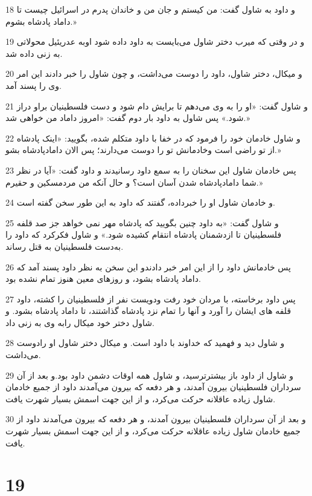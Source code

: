 \par 18 و داود به شاول گفت: من کیستم و جان من و خاندان پدرم در اسرائیل چیست تا داماد پادشاه بشوم.»
\par 19 و در وقتی که میرب دختر شاول می‌بایست به داود داده شود اوبه عدریئیل محولاتی به زنی داده شد.
\par 20 و میکال، دختر شاول، داود را دوست می‌داشت، و چون شاول را خبر دادند این امر وی را پسند آمد.
\par 21 و شاول گفت: «او را به وی می‌دهم تا برایش دام شود و دست فلسطینیان براو دراز شود.» پس شاول به داود بار دوم گفت: «امروز داماد من خواهی شد.»
\par 22 و شاول خادمان خود را فرمود که در خفا با داود متکلم شده، بگویید: «اینک پادشاه از تو راضی است وخادمانش تو را دوست می‌دارند؛ پس الان دامادپادشاه بشو.»
\par 23 پس خادمان شاول این سخنان را به سمع داود رسانیدند و داود گفت: «آیا در نظر شما دامادپادشاه شدن آسان است؟ و حال آنکه من مردمسکین و حقیرم.»
\par 24 و خادمان شاول او را خبرداده، گفتند که داود به این طور سخن گفته است.
\par 25 و شاول گفت: «به داود چنین بگویید که پادشاه مهر نمی خواهد جز صد قلفه فلسطینیان تا ازدشمنان پادشاه انتقام کشیده شود.» و شاول فکرکرد که داود را به‌دست فلسطینیان به قتل رساند.
\par 26 پس خادمانش داود را از این امر خبر دادندو این سخن به نظر داود پسند آمد که داماد پادشاه بشود، و روزهای معین هنوز تمام نشده بود.
\par 27 پس داود برخاسته، با مردان خود رفت ودویست نفر از فلسطینیان را کشته، داود قلفه های ایشان را آورد و آنها را تمام نزد پادشاه گذاشتند، تا داماد پادشاه بشود. و شاول دختر خود میکال رابه وی به زنی داد.
\par 28 و شاول دید و فهمید که خداوند با داود است. و میکال دختر شاول او رادوست می‌داشت.
\par 29 و شاول از داود باز بیشترترسید، و شاول همه اوقات دشمن داود بود.و بعد از آن سرداران فلسطینیان بیرون آمدند، و هر دفعه که بیرون می‌آمدند داود از جمیع خادمان شاول زیاده عاقلانه حرکت می‌کرد، و از این جهت اسمش بسیار شهرت یافت.
\par 30 و بعد از آن سرداران فلسطینیان بیرون آمدند، و هر دفعه که بیرون می‌آمدند داود از جمیع خادمان شاول زیاده عاقلانه حرکت می‌کرد، و از این جهت اسمش بسیار شهرت یافت.
 
\chapter{19}

